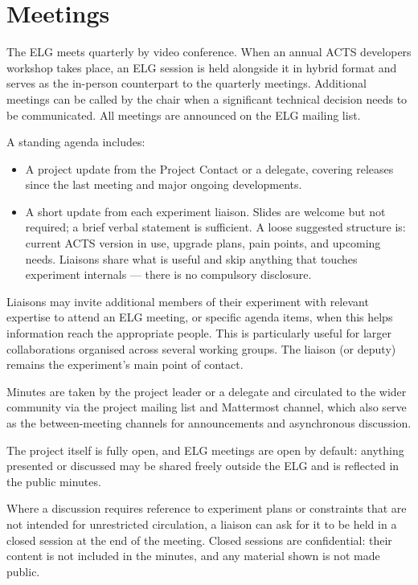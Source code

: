 \documentclass[11pt,a4paper]{article}
\begin{document}
\section*{Meetings}

The ELG meets quarterly by video conference. When an annual ACTS developers workshop takes place, an ELG session is held alongside it in hybrid format and serves as the in-person counterpart to the quarterly meetings. Additional meetings can be called by the chair when a significant technical decision needs to be communicated. All meetings are announced on the ELG mailing list.

A standing agenda includes:

\begin{itemize}
    \item A project update from the Project Contact or a delegate, covering releases since the last meeting and major ongoing developments.
    \item A short update from each experiment liaison. Slides are welcome but not required; a brief verbal statement is sufficient. A loose suggested structure is: current ACTS version in use, upgrade plans, pain points, and upcoming needs. Liaisons share what is useful and skip anything that touches experiment internals --- there is no compulsory disclosure.
\end{itemize}

Liaisons may invite additional members of their experiment with relevant expertise to attend an ELG meeting, or specific agenda items, when this helps information reach the appropriate people. This is particularly useful for larger collaborations organised across several working groups. The liaison (or deputy) remains the experiment's main point of contact.

Minutes are taken by the project leader or a delegate and circulated to the wider community via the project mailing list and Mattermost channel, which also serve as the between-meeting channels for announcements and asynchronous discussion.

The project itself is fully open, and ELG meetings are open by default: anything presented or discussed may be shared freely outside the ELG and is reflected in the public minutes.

Where a discussion requires reference to experiment plans or constraints that are not intended for unrestricted circulation, a liaison can ask for it to be held in a closed session at the end of the meeting. Closed sessions are confidential: their content is not included in the minutes, and any material shown is not made public.
\end{document}
